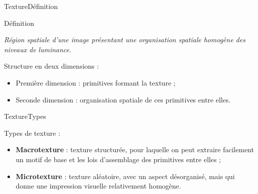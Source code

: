\begin{frame}{Texture}{Définition}
\begin{block}{Définition}

\textit{Région spatiale d'une image présentant une organisation spatiale homogène des niveaux de luminance}.

Structure en deux dimensions :

\begin{itemize}
    \item Première dimension :  primitives formant la texture ;
    \item Seconde dimension : organisation spatiale de ces primitives entre elles.
\end{itemize}

\end{block}

\end{frame}

\begin{frame}{Texture}{Types}
\begin{block}{Types de texture :}

\begin{itemize}
    \item \textbf{Macrotexture} : texture structurée, pour laquelle on peut extraire facilement un motif de base et les lois d'assemblage des primitives entre elles ;
    \item \textbf{Microtexture} : texture aléatoire, avec un aspect désorganisé, mais qui donne une impression visuelle relativement homogène.
\end{itemize}

\end{block}
\end{frame}

